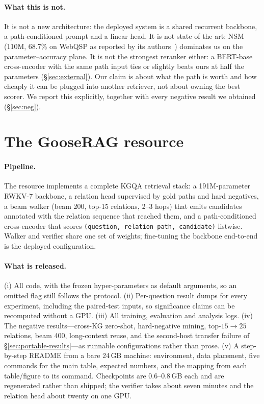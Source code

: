 \documentclass[sigconf,review]{acmart}
\begin{document}
\paragraph{What this is not.}
It is not a new architecture: the deployed system is a shared recurrent backbone, a path-conditioned prompt and a linear head. It is not state of the art: NSM (110M, 68.7\% on WebQSP as reported by its authors~\cite{he2021nsm}) dominates us on the parameter--accuracy plane. It is not the strongest reranker either: a BERT-base cross-encoder with the same path input ties or slightly beats ours at half the parameters (\S\ref{sec:external}). Our claim is about what the path is worth and how cheaply it can be plugged into another retriever, not about owning the best scorer. We report this explicitly, together with every negative result we obtained (\S\ref{sec:neg}).

\section{The GooseRAG resource}
\label{sec:resource}

\paragraph{Pipeline.} The resource implements a complete KGQA retrieval stack: a 191M-parameter RWKV-7 backbone, a relation head supervised by gold paths and hard negatives, a beam walker (beam 200, top-15 relations, 2--3 hops) that emits candidates annotated with the relation sequence that reached them, and a path-conditioned cross-encoder that scores \texttt{(question, relation path, candidate)} listwise. Walker and verifier share one set of weights; fine-tuning the backbone end-to-end is the deployed configuration.

\paragraph{What is released.}
(i) All code, with the frozen hyper-parameters as default arguments, so an omitted flag still follows the protocol.
(ii) Per-question result dumps for every experiment, including the paired-test inputs, so significance claims can be recomputed without a GPU.
(iii) All training, evaluation and analysis logs.
(iv) The negative results---cross-KG zero-shot, hard-negative mining, top-$15\to25$ relations, beam 400, long-context reuse, and the second-host transfer failure of \S\ref{sec:portable-results}---as runnable configurations rather than prose.
(v) A step-by-step README from a bare 24\,GB machine: environment, data placement, five commands for the main table, expected numbers, and the mapping from each table/figure to its command.
Checkpoints are 0.6--0.8\,GB each and are regenerated rather than shipped; the verifier takes about seven minutes and the relation head about twenty on one GPU.
\end{document}
